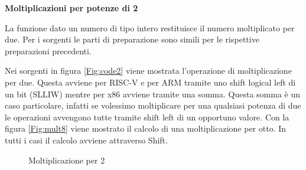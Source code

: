 \documentclass[12pt,a4paper]{report}
\begin{document}
\vspace{0.3 cm}
\textbf{Moltiplicazioni per potenze di 2}



La funzione dato un numero di tipo intero restituisce il numero moltiplicato per due.  Per i sorgenti le parti di preparazione sono simili per le rispettive preparazioni precedenti.


\vspace{0.3 cm}
Nei sorgenti in figura \ref{Fig:code2} viene mostrata l'operazione di moltiplicazione per due. Questa avviene per RISC-V e per ARM tramite uno shift logical left di un bit (SLLIW) mentre per x86 avviene tramite una somma. Questa somma è un caso particolare, infatti se volessimo moltiplicare per una qualsiasi potenza di due  le operazioni avvengono tutte tramite shift left di un opportuno valore.  Con la figura \ref{Fig:mult8} viene mostrato il calcolo di una moltiplicazione per otto. In tutti i casi il calcolo avviene attraverso Shift.


\vspace{0.3 cm}

\begin{figure}
     
     \begin{subfigure}[b]{0.3\textwidth}
  
        
        

	\label{Code:Mul2RISC}
     \end{subfigure}
     \hfill
     \begin{subfigure}[b]{0.3\textwidth}
         
          	
	
		\label{Code:Mul2ARM}
     \end{subfigure}
     \hfill
     \begin{subfigure}[b]{0.3\textwidth}
         
          

	\label{Code:Mul2X86}
     \end{subfigure}
     \caption{Moltiplicazione per 2}
     \end{figure}
 	
\end{document}
